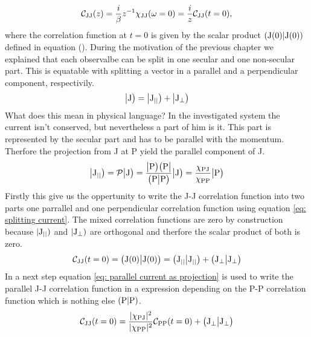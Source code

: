 %
\begin{align}
	\mathcal{C}_{\mathrm{JJ}}(z) = \frac{i}{\beta} z^{-1} \chi_{\mathrm{JJ}}(\omega=0) = \frac{i}{z} \mathcal{C}_{\mathrm{JJ}}(t=0),
	\label{eq: correlation function unpertubated system}
\end{align}
%
where the correlation function at $t = 0$ is given by the scalar product $({\mathrm{J}(0)}|{\mathrm{J}(0)})$ defined in equation ().
During the motivation of the previous chapter we explained that each observalbe can be split in one secular and one non-secular part.
This is equatable with splitting a vector in a parallel and a perpendicular component, respectivily.
%
\begin{align}
	\big|{\mathrm{J}}\big) = \big|{\mathrm{J}_{\mid\mid}}\big) + \big|{\mathrm{J}_{\bot}}\big)
	\label{eq: splitting current}
\end{align}
%
What does this mean in physical language?
In the investigated system the current isn't conserved, but nevertheless a part of him is it.
This part is represented by the secular part and has to be parallel with the momentum.
Therfore the projection from J at P yield the parallel component of J.
%
\begin{align}
	\big|{\mathrm{J}_{\mid\mid}}\big) = \mathcal{P}\big|{\mathrm{J}}\big) = \frac{\big|{\mathrm{P}}\big)\big({\mathrm{P}}\big|}{\big({\mathrm{P}}\big|{\mathrm{P}}\big)} \big|{\mathrm{J}}\big) = \frac{\chi_{\mathrm{PJ}}}{\chi_{\mathrm{PP}}} \big|{\mathrm{P}}\big)
	\label{eq: parallel current as projection}
\end{align}
%
Firstly this give us the oppertunity to write the J-J correlation function into two parts one parrallel and one perpendicular correlation function using equation \eqref{eq: splitting current}.
The mixed correlation functions are zero by construction because $|\mathrm{\mathrm{J}_{\mid\mid}})$ and $|\mathrm{\mathrm{J}_{\bot}})$ are orthogonal and therfore the scalar product of both is zero.
%
\begin{align}
	\mathcal{C}_{\mathrm{JJ}}(t=0) = \big({\mathrm{J}(0)}\big|{\mathrm{J}(0)}\big) = \big({\mathrm{J}_{\mid\mid}}\big|{\mathrm{J}_{\mid\mid}}\big) + \big({\mathrm{J}_{\bot}}\big|{\mathrm{J}_{\bot}}\big)
\end{align}
%
In a next step equation \eqref{eq: parallel current as projection} is used to write the parallel J-J correlation function in a expression depending on the P-P correlation function which is nothing else $({\mathrm{P}}|{\mathrm{P}})$.
%
\begin{align}
	\mathcal{C}_{\mathrm{JJ}}(t=0) = \frac{\vert\chi_{\mathrm{PJ}}\vert^{2}}{\vert\chi_{\mathrm{PP}}\vert^{2}} \mathcal{C}_{\mathrm{PP}}(t=0) + \big({\mathrm{J}_{\bot}}\big|{\mathrm{J}_{\bot}}\big)
\end{align}
